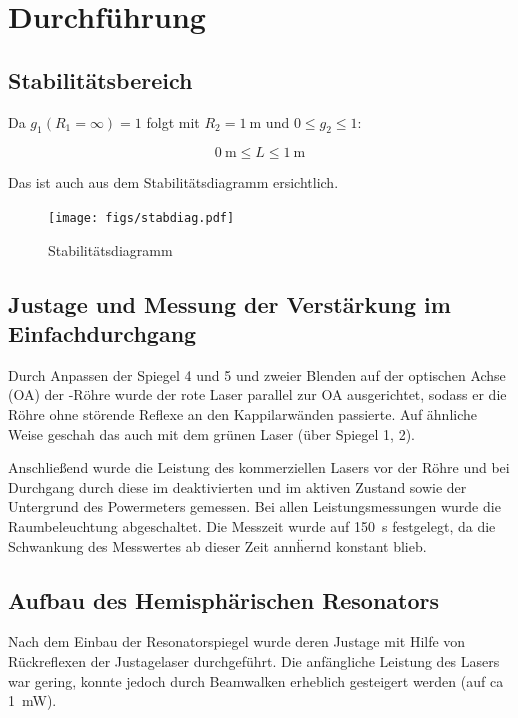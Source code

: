 \documentclass[slug=GL, room=HZDR\ Dresden/Rossendorf\,\ Geb.\ 620/123, supervisor=Tim\ Ziegler]{../../Lab_Report_LaTeX/lab_report}
\begin{document}
\section{Durchf\"uhrung}
\label{sec:durch}

\subsection{Stabilit\"atsbereich}
\label{sec:stabber}

Da \(g_1(R_1=\infty)=1\) folgt mit \(R_2=\SI{1}{\meter}\) und \(0\leq g_2\leq 1\):

\begin{equation}
  \label{eq:stabber}
  \SI{0}{\meter}\leq L \leq \SI{1}{\meter}
\end{equation}

Das ist auch aus dem Stabilit\"atsdiagramm ersichtlich.
\begin{figure}[H]\centering
  \texttt{[image: figs/stabdiag.pdf]}
  \caption[Gauss]{Stabilit\"atsdiagramm}
  \label{fig:stabdiag}
\end{figure}

\subsection{Justage und Messung der Verst\"arkung im Einfachdurchgang}
\label{sec:justage}

Durch Anpassen der Spiegel 4 und 5 und zweier Blenden auf der
optischen Achse (OA) der -R\"ohre wurde der rote Laser
parallel zur OA ausgerichtet, sodass er die R\"ohre ohne st\"orende
Reflexe an den Kappilarw\"anden passierte. Auf \"ahnliche Weise
geschah das auch mit dem gr\"unen Laser (\"uber Spiegel 1, 2).

Anschlie\ss{}end wurde die Leistung des kommerziellen Lasers vor der
R\"ohre und bei Durchgang durch diese im deaktivierten und im aktiven
Zustand sowie der Untergrund des Powermeters gemessen. Bei allen
Leistungsmessungen wurde die Raumbeleuchtung abgeschaltet. Die
Messzeit wurde auf \SI{150}{\second} festgelegt, da die Schwankung
des Messwertes ab dieser Zeit ann\"hernd konstant blieb.

\subsection{Aufbau des Hemisph\"arischen Resonators}
\label{sec:aufbauhemi}

Nach dem Einbau der Resonatorspiegel wurde deren Justage mit Hilfe von
R\"uckreflexen der Justagelaser durchgef\"uhrt. Die anf\"angliche
Leistung des Lasers war gering, konnte jedoch durch Beamwalken
erheblich gesteigert werden (auf ca \SI{1}{\milli\watt}).
\end{document}

